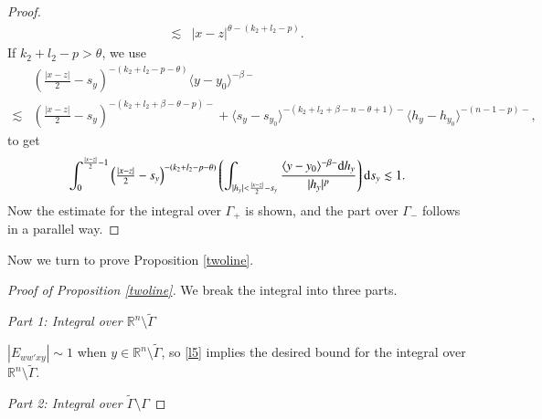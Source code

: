 \documentclass[11pt,reqno]{amsart}
\def\d{{\rm d}}
\numberwithin{equation}{section}
\theoremstyle{definition}
\begin{document}
\begin{appendix}
\begin{proof}
\begin{equation*}
\begin{split}
				\lesssim&|x-z|^{\theta-(k_2+l_2-p)}.
			\end{split}
		\end{equation*}
		If $k_2+l_2-p>\theta$, we use
		\begin{equation*}
			\begin{split}
				&\left(\mbox{$\frac{|x-z|}{2}-s_y$}\right)^{-(k_2+l_2-p-\theta)}\langle y-y_0\rangle^{-\beta-}\\
				\lesssim&\left(\mbox{$\frac{|x-z|}{2}-s_y$}\right)^{-(k_2+l_2+\beta-\theta-p)-}+\langle s_y-s_{y_0}\rangle^{-(k_2+l_2+\beta-n-\theta+1)-}\langle h_y-h_{y_0}\rangle^{-(n-1-p)-},
			\end{split}
		\end{equation*}
		to get
		\begin{equation*}\label{l13}
			\int_0^{\frac{|x-z|}{2}-1}\left(\mbox{$\frac{|x-z|}{2}-s_y$}\right)^{-(k_2+l_2-p-\theta)}\left(\int_{|h_y|<\frac{|x-z|}{2}-s_y}\frac{\langle y-y_0\rangle^{-\beta-}\d h_y}{|h_y|^p}\right)\d s_y\lesssim1.
		\end{equation*}
		Now the estimate for the integral over $\Gamma_+$ is shown, and the part over $\Gamma_-$ follows in a parallel way.
	\end{proof}
	
	
	Now we turn to prove Proposition \ref{twoline}.
	
	\begin{proof}[Proof of Proposition \ref{twoline}]
		We break the integral into three parts.
		
		\noindent\emph{Part 1: Integral over $\mathbb{R}^n\setminus\tilde{\Gamma}$}
		
		$|E_{ww'xy}|\sim1$ when $y\in\mathbb{R}^n\setminus\tilde{\Gamma}$, so \eqref{l5} implies the desired bound for the integral over $\mathbb{R}^n\setminus\tilde{\Gamma}$.
		
		
		\noindent\emph{Part 2: Integral over $\tilde{\Gamma}\setminus\Gamma$}
		

\end{proof}
\end{appendix}
\end{document}
